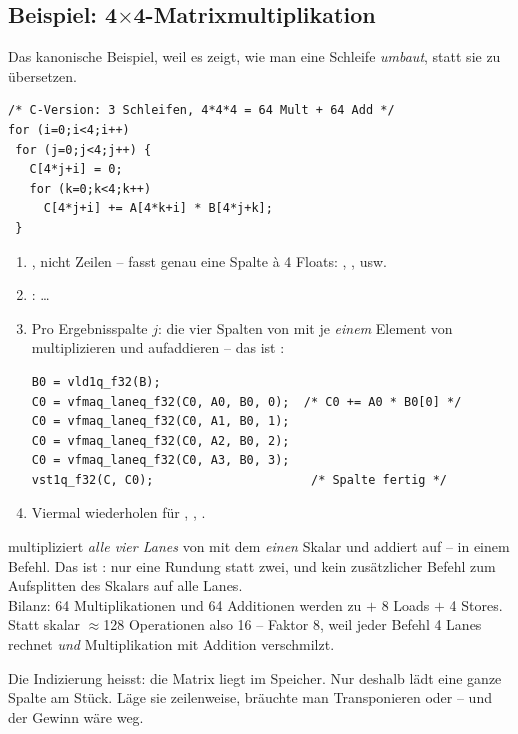 \subsection{Beispiel: 4$\times$4-Matrixmultiplikation}
\label{bsp:matmul}
Das kanonische Beispiel, weil es zeigt, wie man eine Schleife
\emph{umbaut}, statt sie zu übersetzen.
\begin{lstlisting}
/* C-Version: 3 Schleifen, 4*4*4 = 64 Mult + 64 Add */
for (i=0;i<4;i++)
 for (j=0;j<4;j++) {
   C[4*j+i] = 0;
   for (k=0;k<4;k++)
     C[4*j+i] += A[4*k+i] * B[4*j+k];
 }
\end{lstlisting}
\begin{rezept}
\begin{enumerate}
\item {}, nicht Zeilen --  fasst genau
      eine Spalte à 4 Floats:
      , , usw.
\item {}:  \dots
\item Pro Ergebnisspalte $j$: die vier Spalten von  mit je
      \emph{einem} Element von  multiplizieren und aufaddieren --
      das ist :
\begin{lstlisting}
B0 = vld1q_f32(B);
C0 = vfmaq_laneq_f32(C0, A0, B0, 0);  /* C0 += A0 * B0[0] */
C0 = vfmaq_laneq_f32(C0, A1, B0, 1);
C0 = vfmaq_laneq_f32(C0, A2, B0, 2);
C0 = vfmaq_laneq_f32(C0, A3, B0, 3);
vst1q_f32(C, C0);                      /* Spalte fertig */
\end{lstlisting}
\item Viermal wiederholen für , , .
\end{enumerate}
\end{rezept}
\begin{formel}
 multipliziert \emph{alle vier
Lanes} von  mit dem \emph{einen} Skalar  und addiert auf
 -- in einem Befehl. Das ist : nur eine
Rundung statt zwei, und kein zusätzlicher Befehl zum Aufsplitten des
Skalars auf alle Lanes.\\[2pt]
Bilanz: 64 Multiplikationen und 64 Additionen werden zu
 $+$ 8 Loads $+$ 4 Stores. Statt skalar
$\approx$128 Operationen also 16 -- Faktor 8, weil jeder Befehl 4 Lanes
rechnet \emph{und} Multiplikation mit Addition verschmilzt.
\end{formel}
\begin{falle}
Die Indizierung  heisst: die Matrix liegt
 im Speicher. Nur deshalb lädt  eine
ganze Spalte am Stück. Läge sie zeilenweise, bräuchte man Transponieren
oder  -- und der Gewinn wäre weg. 
\end{falle}
